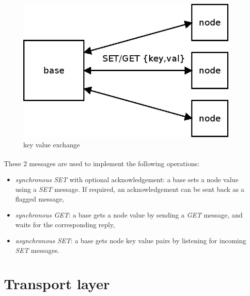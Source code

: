\documentclass[a4paper, 11pt]{article}
\begin{document}
\begin{figure}[!h]
\begin{center}
\includegraphics[scale=0.2]{../dia/overview_keyval/main.jpeg}
\end{center}
\caption{\tiny{key value exchange}}
\label{overview_keyval}
\end{figure}

\paragraph{}
These 2 messages are used to implement the following operations:
\begin{itemize}
\item \textit{synchronous SET} with optional acknowledgement: a base sets a
node value using a \textit{SET} message. If required, an acknowledgement can
be sent back as a flagged message,
\item \textit{synchronous GET}: a base gets a node value by sending a
\textit{GET} message, and waits for the corresponding reply,
\item \textit{asynchronous SET}: a base gets node key value pairs by listening
for incoming \textit{SET} messages.
\end{itemize}


\clearpage
\section{Transport layer}
\end{document}
